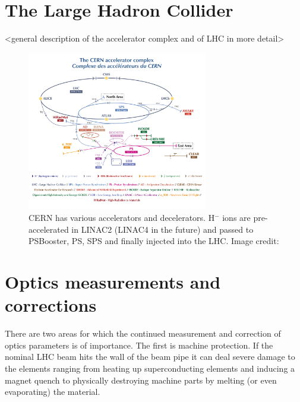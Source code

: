 \section{The Large Hadron Collider}

<general description of the accelerator complex and of LHC in more detail>
%

\begin{figure}[h]
    \centering
    \includegraphics[width=0.7\textwidth]{CCC-v2019-final-white_small}
    \caption{CERN has various accelerators and decelerators. H$^-$ ions are pre-accelerated
    in LINAC2 (LINAC4 in the future) and passed to PSBooster, PS, SPS and finally injected into
    the LHC. Image credit: \cite{CERN_AccCmplx}}
    \label{fig_cern_acc_cmplx}
\end{figure}

\section{Optics measurements and corrections}

There are two areas for which the continued measurement and correction of optics parameters is of
importance. The first is machine protection. If the nominal LHC beam hits the wall of the beam pipe
it can deal severe damage to the elements ranging from heating up superconducting elements and
inducing a magnet quench to physically destroying machine parts by melting (or even evaporating) the
material.

